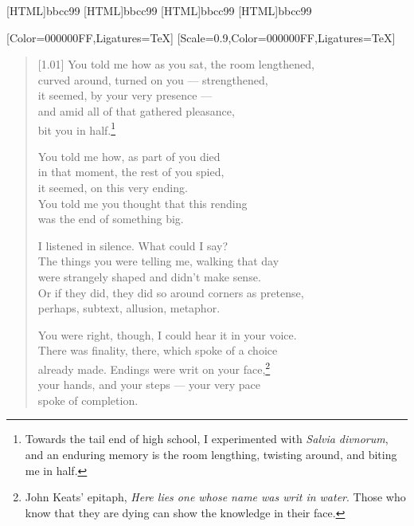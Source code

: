 [HTML]{bbcc99}
[HTML]{bbcc99}
[HTML]{bbcc99}
[HTML]{bbcc99}
\begin{paracol}{2}
  \begin{leftcolumn}
[Color=000000FF,Ligatures=TeX]
\renewfontfamily{}[Scale=0.9,Color=000000FF,Ligatures=TeX]

\begin{verse}[1.01\textwidth]
You told me how as you sat, the room lengthened,\\
curved around, turned on you --- strengthened,\\
it seemed, by your very presence ---\\
and amid all of that gathered pleasance,\\
bit you in half.\footnote{Towards the tail end of high school, I experimented with \emph{Salvia divnorum}, and an enduring memory is the room lengthing, twisting around, and biting me in half.}

You told me how, as part of you died\\
in that moment, the rest of you spied,\\
it seemed, on this very ending.\\
You told me you thought that this rending\\
was the end of something big.

I listened in silence. What could I say?\\
The things you were telling me, walking that day\\
were strangely shaped and didn't make sense.\\
Or if they did, they did so around corners as pretense,\\
perhaps, subtext, allusion, metaphor.

You were right, though, I could hear it in your voice.\\
There was finality, there, which spoke of a choice\\
already made. Endings were writ on your face,\footnote{John Keats' epitaph, \emph{Here lies one whose name was writ in water}. Those who know that they are dying can show the knowledge in their face.}\\
your hands, and your steps --- your very pace\\
spoke of completion.
\end{verse}
\newpage
\end{leftcolumn}
\end{paracol}

